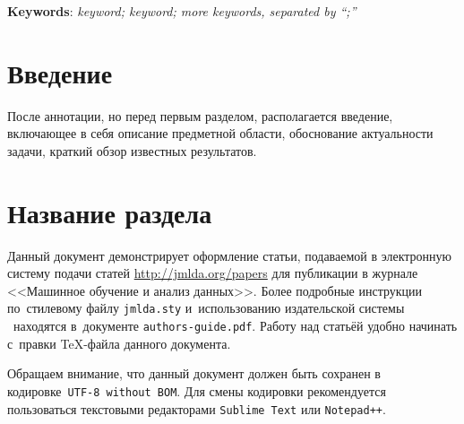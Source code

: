 \documentclass[12pt, twoside]{article}
\begin{document}
{	%
	
	
		
		
	\noindent
    	\textbf{Keywords}: \emph{keyword; keyword; more keywords, separated by ``;''}}


\maketitle
\linenumbers

\section{Введение}
После аннотации, но перед первым разделом,
располагается введение, включающее в себя
описание предметной области,
обоснование актуальности задачи,
краткий обзор известных результатов.

\section{Название раздела}
Данный документ демонстрирует оформление статьи,
подаваемой в электронную систему подачи статей \url{http://jmlda.org/papers} для публикации в журнале <<Машинное обучение и анализ данных>>.
Более подробные инструкции по~стилевому файлу \texttt{jmlda.sty} и~использованию издательской системы \LaTeXe\
находятся в~документе \texttt{authors-guide.pdf}.
Работу над статьёй удобно начинать с~правки \TeX-файла данного документа.

Обращаем внимание, что данный документ должен быть сохранен в кодировке~\verb'UTF-8 without BOM'.
Для смены кодировки рекомендуется пользоваться текстовыми редакторами \verb'Sublime Text' или \verb'Notepad++'.
\end{document}
